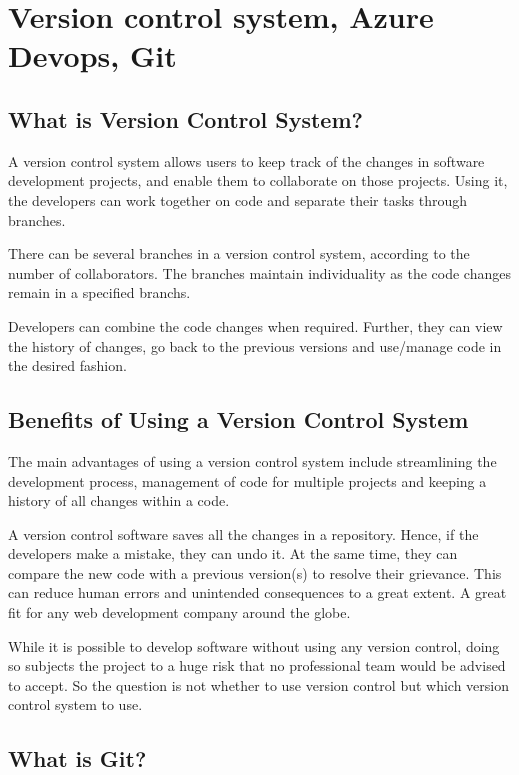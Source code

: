 \documentclass[10pt,oneside,a4paper]{article}
\begin{document}
\section*{Version control system, Azure Devops, Git}

\subsection*{What is Version Control System?}

A version control system allows users to keep track of the changes in software development projects, and enable them to collaborate on those projects. Using it, the developers can work together on code and separate their tasks through branches.

There can be several branches in a version control system, according to the number of collaborators. The branches maintain individuality as the code changes remain in a specified branchs.

Developers can combine the code changes when required. Further, they can view the history of changes, go back to the previous versions and use/manage code in the desired fashion.\cite{What}



\subsection*{Benefits of Using a Version Control System}

The main advantages of using a version control system include streamlining the development process, management of code for multiple projects and keeping a history of all changes within a code.

A version control software saves all the changes in a repository. Hence, if the developers make a mistake, they can undo it. At the same time, they can compare the new code with a previous version(s) to resolve their grievance. This can reduce human errors and unintended consequences to a great extent. A great fit for any web development company around the globe.

While it is possible to develop software without using any version control, doing so subjects the project to a huge risk that no professional team would be advised to accept. So the question is not whether to use version control but which version control system to use.

\subsection*{What is Git?}
\end{document}
